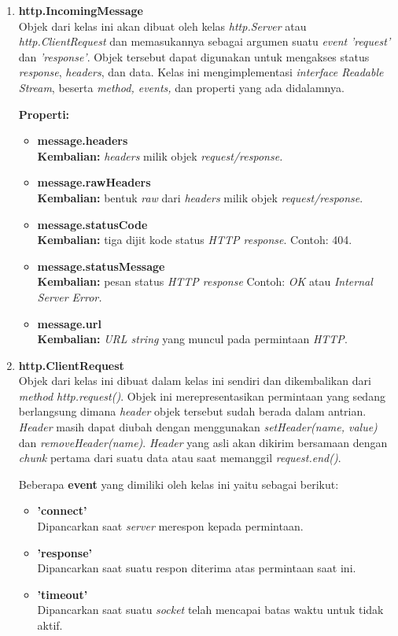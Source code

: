 \begin{enumerate}
	\item \textbf{http.IncomingMessage} \\ 
	Objek dari kelas ini akan dibuat oleh kelas \textit{http.Server} atau \textit{http.ClientRequest} dan memasukannya sebagai argumen suatu \textit{event} \textit{'request'} dan \textit{'response'}. Objek tersebut dapat digunakan untuk mengakses status \textit{response}, \textit{headers}, dan data. Kelas ini mengimplementasi \textit{interface Readable Stream}, beserta \textit{method, events,} dan properti yang ada didalamnya.
	
	\textbf{Properti:}
	\begin{itemize}
		\item \textbf{message.headers} \\ \textbf{Kembalian:} \textit{headers} milik objek \textit{request/response.}
		\item \textbf{message.rawHeaders} \\ \textbf{Kembalian:} bentuk \textit{raw} dari \textit{headers} milik objek \textit{request/response}.
		\item \textbf{message.statusCode} \\ \textbf{Kembalian:} tiga dijit kode status \textit{HTTP response}. Contoh: 404.
		\item \textbf{message.statusMessage} \\ \textbf{Kembalian:} pesan status \textit{HTTP response} Contoh: \textit{OK} atau \textit{Internal Server Error.}
		\item \textbf{message.url} \\ \textbf{Kembalian:} \textit{URL string} yang muncul pada permintaan \textit{HTTP}.
	\end{itemize}
	
	\item \textbf{http.ClientRequest} \\ 
	Objek dari kelas ini dibuat dalam kelas ini sendiri dan dikembalikan dari \textit{method http.request()}. Objek ini merepresentasikan permintaan yang sedang berlangsung dimana \textit{header} objek tersebut sudah berada dalam antrian. \textit{Header} masih dapat diubah dengan menggunakan \textit{setHeader(name, value)} dan \textit{removeHeader(name)}. \textit{Header} yang asli akan dikirim bersamaan dengan \textit{chunk} pertama dari suatu data atau saat memanggil \textit{request.end()}.
	
	Beberapa \textbf{event} yang dimiliki oleh kelas ini yaitu sebagai berikut:
	\begin{itemize}
		\item \textbf{'connect'} \\ Dipancarkan saat \textit{server} merespon kepada permintaan.
		\item \textbf{'response'} \\ Dipancarkan saat suatu respon diterima atas permintaan saat ini.
		\item \textbf{'timeout'} \\ Dipancarkan saat suatu \textit{socket} telah mencapai batas waktu untuk tidak aktif.
	\end{itemize}
	

\end{enumerate}
